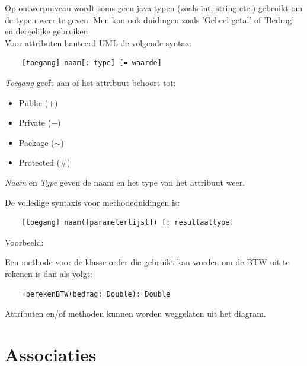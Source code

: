 \documentclass{article}
\begin{document}
	Op ontwerpniveau wordt soms geen java-typen (zoals int, string etc.) gebruikt om de typen weer te geven. Men kan ook duidingen zoals 'Geheel getal' of 'Bedrag' en dergelijke gebruiken. \\
	
	Voor attributen hanteerd UML de volgende syntax: \\
	\begin{verbatim}
	[toegang] naam[: type] [= waarde]
	\end{verbatim}

	\smallskip
	
	\noindent \textit{Toegang} geeft aan of het attribuut behoort tot: \\
	\begin{itemize}
		\item Public	(+)
		\item Private	($-$)
		\item Package	($\sim$)
		\item Protected (\#)
	\end{itemize}
	
	\noindent \textit{Naam} en \textit{Type} geven de naam en het type van het attribuut weer.
	
	\noindent De volledige syntaxis voor methodeduidingen is: \\
	\begin{verbatim}
	[toegang] naam([parameterlijst]) [: resultaattype]
	\end{verbatim}

	Voorbeeld: \\
	
	\smallskip
	
	\noindent Een methode voor de klasse order die gebruikt kan worden om de BTW uit te rekenen is dan als volgt: \\

	\begin{verbatim}
	+berekenBTW(bedrag: Double): Double
	\end{verbatim}
	
	Attributen en/of methoden kunnen worden weggelaten uit het diagram. \\
	\newpage
	
	\section{Associaties}
	
\end{document}
